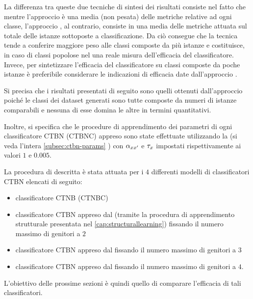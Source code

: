 La differenza tra queste due tecniche di sintesi dei risultati consiste nel fatto che mentre l'approccio \emph{} è una media (non pesata) delle metriche relative ad ogni classe, l'approccio \emph{}, al contrario, consiste in una media delle metriche attuata sul totale delle istanze sottoposte a classificazione. Da ciò consegue che la tecnica \emph{} tende a conferire maggiore peso alle classi composte da più istanze e costituisce, in caso di classi popolose nel \emph{} una reale misura dell'efficacia del classificatore. Invece, per sintetizzare l'efficacia del classificatore su classi composte da poche istanze è preferibile considerare le indicazioni di efficacia date dall'approccio \emph{} \citep[si veda][sezione 13.6]{Manning2008}.

Si precisa che i risultati presentati di seguito sono quelli ottenuti dall'approccio \emph{} poiché le classi dei dataset generati sono tutte composte da numeri di istanze comparabili e nessuna di esse domina le altre in termini quantitativi.

Inoltre, si specifica che le procedure di apprendimento dei parametri di ogni classificatore \acs{CTBN} (\acs{CTBNC}) appreso sono state effettuate utilizzando la \emph{} (si veda l'intera \autoref{subsec:ctbn-params} ) con  $\alpha_{\mathnormal{x}\mathnormal{x}^{\prime}}$ e $\tau_{\mathnormal{x}}$ impostati rispettivamente ai valori $1$ e $0.005$.

La procedura di  descritta è stata attuata per i $4$ differenti modelli di classificatori \acs{CTBN} elencati di seguito:
\begin{itemize}
	\item classificatore \acs{CTNB} (\acs{CTNBC})
	\item classificatore \acs{CTBN} appreso dal \emph{} (tramite la procedura di apprendimento strutturale presentata nel \vref{cap:structurallearning}) fissando il numero massimo di genitori a $2$
	\item classificatore \acs{CTBN} appreso dal \emph{} fissando il numero massimo di genitori a $3$
	\item classificatore \acs{CTBN} appreso dal \emph{} fissando il numero massimo di genitori a $4$.
\end{itemize}
L'obiettivo delle prossime sezioni è quindi quello di comparare l'efficacia di tali classificatori.

